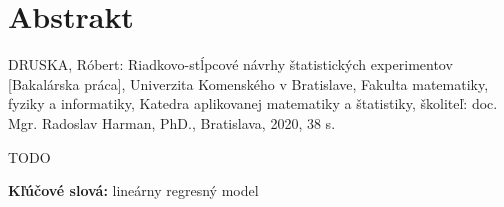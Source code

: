 \thispagestyle{empty}
\section*{Abstrakt}
DRUSKA, Róbert: Riadkovo-stĺpcové návrhy štatistických experimentov [Bakalárska práca],
Univerzita Komenského v Bratislave,
Fakulta matematiky, fyziky a informatiky,
Katedra aplikovanej matematiky a štatistiky,
školiteľ: doc. Mgr. Radoslav Harman, PhD.,
Bratislava, 2020, 38 s.

TODO

\begin{flushleft}
  \textbf{Kľúčové slová:} lineárny regresný model
\end{flushleft}